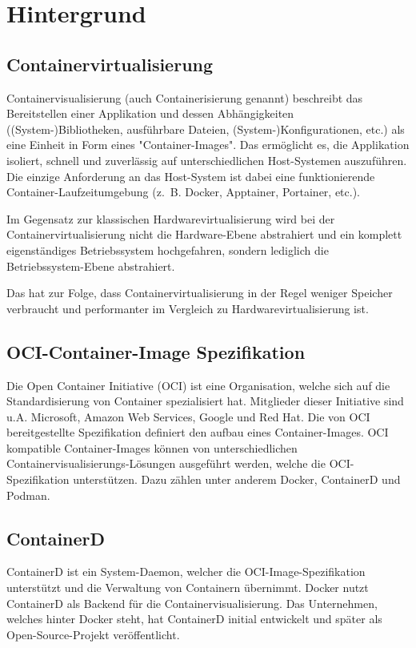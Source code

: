 \chapter{Hintergrund} \label{cha:background}

\section{Containervirtualisierung}

Containervisualisierung (auch Containerisierung genannt) beschreibt das Bereitstellen einer Applikation und dessen Abhängigkeiten ((System-)Bibliotheken, ausführbare Dateien, (System-)Konfigurationen, etc.) als eine Einheit in Form eines "Container-Images". Das ermöglicht es, die Applikation isoliert, schnell und zuverlässig auf unterschiedlichen Host-Systemen auszuführen. Die einzige Anforderung an das Host-System ist dabei eine funktionierende Container-Laufzeitumgebung (z. B. Docker, Apptainer, Portainer, etc.).

Im Gegensatz zur klassischen Hardwarevirtualisierung wird bei der Containervirtualisierung nicht die Hardware-Ebene abstrahiert und ein komplett eigenständiges Betriebssystem hochgefahren, sondern lediglich die Betriebssystem-Ebene abstrahiert.

Das hat zur Folge, dass Containervirtualisierung in der Regel weniger Speicher verbraucht und performanter im Vergleich zu Hardwarevirtualisierung ist. 

\section{OCI-Container-Image Spezifikation}

Die Open Container Initiative (OCI) ist eine Organisation, welche sich auf die Standardisierung von Container spezialisiert hat. Mitglieder dieser Initiative sind u.A. Microsoft, Amazon Web Services, Google und Red Hat. Die von OCI bereitgestellte Spezifikation definiert den aufbau eines Container-Images. OCI kompatible Container-Images können von unterschiedlichen Containervisualisierungs-Lösungen ausgeführt werden, welche die OCI-Spezifikation unterstützen. Dazu zählen unter anderem Docker, ContainerD und Podman.

\section{ContainerD}

ContainerD ist ein System-Daemon, welcher die OCI-Image-Spezifikation unterstützt und die Verwaltung von Containern übernimmt. Docker nutzt ContainerD als Backend für die Containervisualisierung. Das Unternehmen, welches hinter Docker steht, hat ContainerD initial entwickelt und später als Open-Source-Projekt veröffentlicht.

